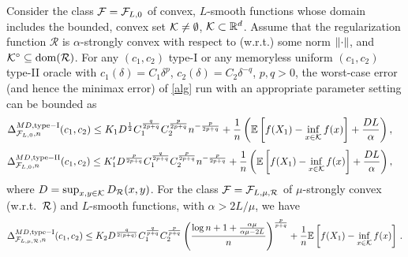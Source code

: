 \begin{theorem}
\label{thm:ub}
Consider the class $\mathcal{F}=\mathcal{F}_{L,0}$ of convex, $L$-smooth functions whose domain includes the bounded, convex set $\mathcal{K}\ne \emptyset$, $\mathcal{K} \subset \mathbb{R}^d$. 
Assume that the regularization function $\mathcal{R}$ is $\alpha$-strongly convex with respect to (w.r.t.)  some norm $\left\|\cdot\right\|$, and $\mathcal{K}^\circ\subseteq \operatorname{dom}(\mathcal{R})$.
For any $(c_1,c_2)$ type-I or any memoryless uniform $(c_1,c_2)$ type-II oracle 
with $c_1(\delta) = C_1 \delta^p$, $c_2(\delta) = C_2 \delta^{-q}$, $p,q>0$, 
the worst-case error (and hence the minimax error) of \cref{alg} run with an appropriate parameter setting
can be bounded as 
 \begin{align}
 \label{eq:MDbound1TypeI}
 \Delta_{\mathcal{F}_{L,0},n}^{MD, \mathrm{type-I}}(c_1,c_2) 
 &\leq  K_1 D^{ \frac{1}{2}} C_1^{\frac{q}{2p+q} } C_2^{\frac{p}{2p+q}} n ^{-\frac{p}{2p+q}} + \frac{1}{n}\left(\mathbb{E}\left[f(X_1)-\inf_{x \in \mathcal{K}}f(x)\right]+\frac{DL}{\alpha}  \right),
 \end{align}
 \begin{align}
 \label{eq:MDbound1}
 \Delta_{\mathcal{F}_{L,0},n}^{MD, \mathrm{type-II}}(c_1,c_2) 
 &\leq  K'_1 D^{ \frac{p}{2p+q}} C_1^{\frac{q}{2p+q} } C_2^{\frac{p}{2p+q}} n ^{-\frac{p}{2p+q}} + \frac{1}{n}\left(\mathbb{E}\left[f(X_1)-\inf_{x \in \mathcal{K}}f(x)\right]+\frac{DL}{\alpha}  \right),
 \end{align}
 where $D=\sup_{x,y\in \mathcal{K}} D_{\mathcal{R}}(x,y)$.
 For the class $\mathcal{F}=\mathcal{F}_{L,\mu,\mathcal{R}}$ of $\mu$-strongly convex (w.r.t.\  $\mathcal{R}$) and $L$-smooth functions, with $\alpha >2L/\mu$, 
we have
\begin{align}
\Delta_{\F_{L,\mu,\cR},n}^{MD, \mathrm{type-I}}(c_1,c_2) 
\leq  K_2D^{\frac{q}{2(p+q)}}C_1^{\frac{q}{p+q}}C_2^{\frac{p}{p+q}} \left( \frac{\log n+1+\frac{\alpha \mu}{\alpha \mu -2L}}{n} \right)^{\frac{p}{p+q}}  + \frac{1}{n}\EE{f(X_1)-\inf_{x \in \cK}f(x)} 
\,.
\label{eq:MDbound2TypeI}

\end{align}
\end{theorem}

